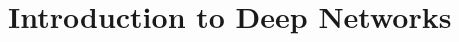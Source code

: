 \renewcommand{\prevpart}{1 }
\renewcommand{\thispart}{2 }
\renewcommand{\nextpart}{3 }

\section{Introduction to Deep Networks}




